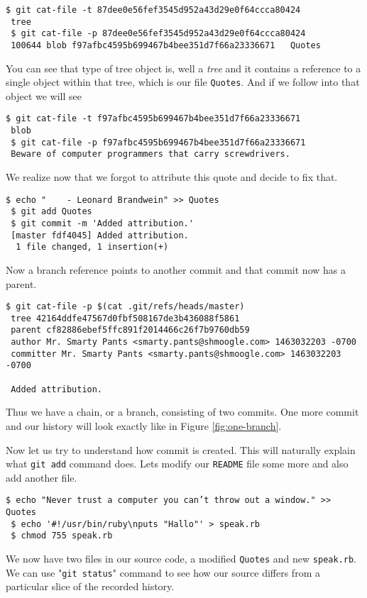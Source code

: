\documentclass{article}
\theoremstyle{definition}
\begin{document}
        \begin{Verbatim}[frame=single]
 $ git cat-file -t 87dee0e56fef3545d952a43d29e0f64ccca80424
 tree
 $ git cat-file -p 87dee0e56fef3545d952a43d29e0f64ccca80424
 100644 blob f97afbc4595b699467b4bee351d7f66a23336671   Quotes
        \end{Verbatim}
        You can see that type of tree object is, well a {\em tree} and it contains a reference to a single object
        within that tree, which is our file \texttt{Quotes}. And if we follow into that object we will see

        \begin{Verbatim}[frame=single]
 $ git cat-file -t f97afbc4595b699467b4bee351d7f66a23336671
 blob
 $ git cat-file -p f97afbc4595b699467b4bee351d7f66a23336671
 Beware of computer programmers that carry screwdrivers.
        \end{Verbatim}
        We realize now that we forgot to attribute this quote and decide to fix that.

        \begin{Verbatim}[frame=single]
 $ echo "    - Leonard Brandwein" >> Quotes
 $ git add Quotes
 $ git commit -m 'Added attribution.'
 [master fdf4045] Added attribution.
  1 file changed, 1 insertion(+)
        \end{Verbatim}
        Now a branch reference points to another commit and that commit now has a parent.
        \begin{Verbatim}[frame=single]
 $ git cat-file -p $(cat .git/refs/heads/master)
 tree 42164ddfe47567d0fbf508167de3b436088f5861
 parent cf82886ebef5ffc891f2014466c26f7b9760db59
 author Mr. Smarty Pants <smarty.pants@shmoogle.com> 1463032203 -0700
 committer Mr. Smarty Pants <smarty.pants@shmoogle.com> 1463032203 -0700

 Added attribution.
        \end{Verbatim}

        \noindent Thus we have a chain, or a branch, consisting of two commits. One more commit and our history will
        look exactly like in Figure \ref{fig:one-branch}.

        Now let us try to understand how commit is created. This will naturally explain what \texttt{git add} command
        does. Lets modify our \texttt{README} file some more and also add another file.

        \begin{Verbatim}[frame=single]
 $ echo "Never trust a computer you can’t throw out a window." >> Quotes
 $ echo '#!/usr/bin/ruby\nputs "Hallo"' > speak.rb
 $ chmod 755 speak.rb
        \end{Verbatim}
        We now have two files in our source code, a modified \texttt{Quotes} and new \texttt{speak.rb}. We can use
        "\texttt{git status}" command to see how our source differs from a particular slice of the recorded history.
\end{document}
